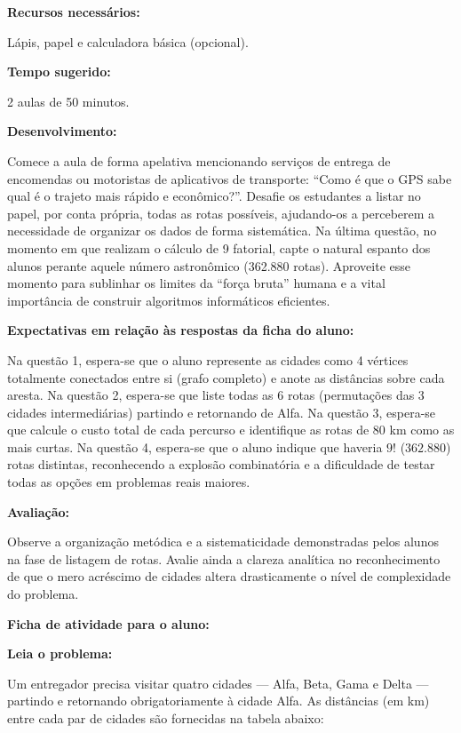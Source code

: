 \documentclass[
  12pt,
  oneside,
  a4paper,
  english,
  brazilian
  ]{abntex2}
\theoremstyle{definition}
\begin{document}
\begin{apendicesenv}
\textbf{Recursos necessários:}

Lápis, papel e calculadora básica (opcional).

\textbf{Tempo sugerido:}

2 aulas de 50 minutos.

\textbf{Desenvolvimento:}

Comece a aula de forma apelativa mencionando serviços de entrega de encomendas ou motoristas de aplicativos de transporte: ``Como é que o GPS sabe qual é o trajeto mais rápido e econômico?''. Desafie os estudantes a listar no papel, por conta própria, todas as rotas possíveis, ajudando-os a perceberem a necessidade de organizar os dados de forma sistemática. Na última questão, no momento em que realizam o cálculo de 9 fatorial, capte o natural espanto dos alunos perante aquele número astronômico (362.880 rotas). Aproveite esse momento para sublinhar os limites da ``força bruta'' humana e a vital importância de construir algoritmos informáticos eficientes.

\textbf{Expectativas em relação às respostas da ficha do aluno:}

Na questão 1, espera-se que o aluno represente as cidades como 4 vértices totalmente conectados entre si (grafo completo) e anote as distâncias sobre cada aresta. Na questão 2, espera-se que liste todas as 6 rotas (permutações das 3 cidades intermediárias) partindo e retornando de Alfa. Na questão 3, espera-se que calcule o custo total de cada percurso e identifique as rotas de 80 km como as mais curtas. Na questão 4, espera-se que o aluno indique que haveria $9!$ ($362.880$) rotas distintas, reconhecendo a explosão combinatória e a dificuldade de testar todas as opções em problemas reais maiores.

\textbf{Avaliação:}

Observe a organização metódica e a sistematicidade demonstradas pelos alunos na fase de listagem de rotas. Avalie ainda a clareza analítica no reconhecimento de que o mero acréscimo de cidades altera drasticamente o nível de complexidade do problema.

\newpage
\begin{center}
\textbf{Ficha de atividade para o aluno:}
\end{center}

\textbf{Leia o problema:}

Um entregador precisa visitar quatro cidades — Alfa, Beta, Gama e Delta — partindo e retornando obrigatoriamente à cidade Alfa. As distâncias (em km) entre cada par de cidades são fornecidas na tabela abaixo:


\end{apendicesenv}
\end{document}
